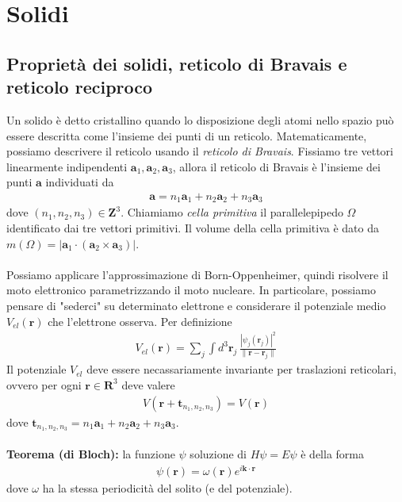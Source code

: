 \documentclass{article}
\begin{document}
\newpage
\section{Solidi}
\subsection{Proprietà dei solidi, reticolo di Bravais e reticolo reciproco}
Un solido è detto cristallino quando lo disposizione degli atomi nello spazio può essere descritta come l'insieme dei punti di un reticolo. Matematicamente, possiamo descrivere il reticolo usando il \textit{reticolo di Bravais}. Fissiamo tre vettori linearmente indipendenti  $\mathbf{a}_1, \mathbf{a}_2, \mathbf{a}_3$, allora il reticolo di Bravais è l'insieme dei punti $\mathbf{a}$ individuati da 
\begin{align}
    \mathbf{a} = n_1\mathbf{a}_1 + n_2\mathbf{a}_2 + n_3\mathbf{a}_3 \tag{4.1.1}
\end{align}
dove $(n_1, n_2, n_3) \in \mathbf{Z}^3$. Chiamiamo \textit{cella primitiva} il parallelepipedo $\Omega$ identificato dai tre vettori primitivi. Il volume della cella primitiva è dato da $m(\Omega) = |\mathbf{a}_1 \cdot (\mathbf{a}_2 \times \mathbf{a}_3)|$. \\ \\
Possiamo applicare l'approssimazione di Born-Oppenheimer, quindi risolvere il moto elettronico parametrizzando il moto nucleare. In particolare, possiamo pensare di "sederci" su determinato elettrone e considerare il potenziale medio $V_{el}(\mathbf{r})$ che l'elettrone osserva. Per definizione 
\begin{align}
    V_{el}(\mathbf{r}) = \sum_j \int d^3\mathbf{r}_j \, \frac{|\psi_j(\mathbf{r}_j)|^2}{\|\mathbf{r} - \mathbf{r}_j\|} \tag{4.1.2}
\end{align}
Il potenziale $V_{el}$ deve essere necassariamente invariante per traslazioni reticolari, ovvero per ogni $\mathbf{r} \in \mathbf{R}^3$ deve valere
\begin{align}
    V(\mathbf{r} + \mathbf{t}_{n_1, n_2, n_3}) = V(\mathbf{r}) \tag{4.1.3}
\end{align}
dove $\mathbf{t}_{n_1, n_2, n_3} = n_1\mathbf{a}_1 + n_2\mathbf{a}_2 + n_3\mathbf{a}_3$. \\ \\
\textbf{Teorema (di Bloch):} la funzione $\psi$ soluzione di $H\psi = E\psi$ è della forma
\begin{align}
    \psi(\mathbf{r}) = \omega(\mathbf{r})e^{i\mathbf{k} \cdot \mathbf{r}} \tag{4.1.4}
\end{align}
dove $\omega$ ha la stessa periodicità del solito (e del potenziale). \\
\end{document}
